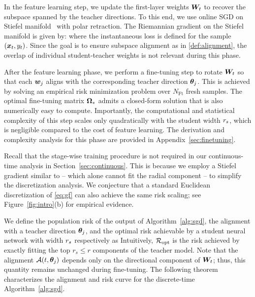 In the feature learning step, we update the first-layer weights $\boldsymbol{W}_t$ to recover the subspace spanned by the teacher directions. To this end, we use online SGD on Stiefel manifold~\cite{arous2024high} with polar retraction.  The Riemannian gradient on the Stiefel manifold is given by:
where the instantaneous loss is defined for  the sample $(\boldsymbol{x}_{t}, y_{t})$.
Since the goal is to ensure subspace alignment as in \eqref{def:alignment}, the overlap of individual student-teacher weights is not relevant during this phase.

After the feature learning phase, we perform a fine-tuning step to rotate $\boldsymbol{W}_t$ so that each $\boldsymbol{w}_j$ aligns with the corresponding teacher direction $\boldsymbol{\theta}_j$. This is achieved by solving an empirical risk minimization problem over $N_{\mathrm{Ft}}$ fresh samples.  The optimal fine-tuning matrix $\boldsymbol{\Omega}_*$ admits a closed-form solution that is also numerically easy to compute. Importantly, the computational and statistical complexity of this step scales only quadratically with the student width $r_s$, which is negligible compared to the cost of feature learning. 
The derivation and complexity analysis for this phase are provided in Appendix~\ref{sec:finetuning}.

\begin{remark}
Recall that the stage-wise training procedure is not required in our continuous-time analysis in Section~\ref{sec:continuous}. This is because we employ a Stiefel gradient similar to \cite{bietti2023learning,arous2024high} -- which alone cannot fit the radial component -- to simplify the discretization analysis. 
We conjecture that a standard Euclidean discretization of \eqref{eq:gf} can also achieve the same risk scaling; see Figure~\ref{fig:intro}(b) for empirical evidence. 
\end{remark}



We define the population risk of the output of Algorithm~\ref{alg:sgd}, the alignment with a teacher direction $\boldsymbol{\theta}_j$, and the optimal risk achievable by a student neural network with width $r_s$ respectively as
Intuitively, $\mathcal{R}_{\mathrm{opt}}$ is the risk achieved by exactly fitting the top $r_s\le r$ components of the teacher model. 
Note that the alignment $\mathcal{A}(t, \boldsymbol{\theta}_j)$ depends only on the directional component of $\boldsymbol{W}_t$; thus, this quantity remains unchanged during fine-tuning. 
The following theorem characterizes the alignment and risk curve for the discrete-time Algorithm~\ref{alg:sgd}.
 
